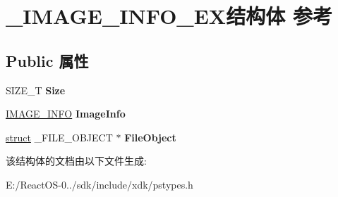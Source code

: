 \hypertarget{struct___i_m_a_g_e___i_n_f_o___e_x}{}\section{\+\_\+\+I\+M\+A\+G\+E\+\_\+\+I\+N\+F\+O\+\_\+\+E\+X结构体 参考}
\label{struct___i_m_a_g_e___i_n_f_o___e_x}
\subsection*{Public 属性}
\begin{DoxyCompactItemize}
\item 
\mbox{\label{struct___i_m_a_g_e___i_n_f_o___e_x_a54bb933a7e6b230d8109335957895eac}} 
S\+I\+Z\+E\+\_\+T {\bfseries Size}
\item 
\mbox{\label{struct___i_m_a_g_e___i_n_f_o___e_x_ac6d79fbc41cf5c9e02890ba33c74ea65}} 
\hyperlink{struct___i_m_a_g_e___i_n_f_o}{I\+M\+A\+G\+E\+\_\+\+I\+N\+FO} {\bfseries Image\+Info}
\item 
\mbox{\label{struct___i_m_a_g_e___i_n_f_o___e_x_a614a6e565ffd85e8b7903b75a94b0082}} 
\hyperlink{interfacestruct}{struct} \+\_\+\+F\+I\+L\+E\+\_\+\+O\+B\+J\+E\+CT $\ast$ {\bfseries File\+Object}
\end{DoxyCompactItemize}


该结构体的文档由以下文件生成\+:\begin{DoxyCompactItemize}
\item 
E\+:/\+React\+O\+S-\/0../sdk/include/xdk/pstypes.\+h\end{DoxyCompactItemize}
